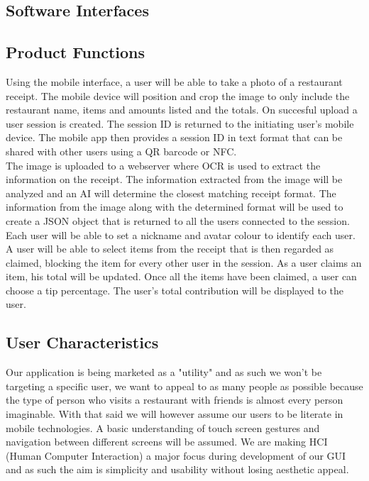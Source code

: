 \documentclass[12pt,a4paper]{article}
\begin{document}
   	\subsection{Software Interfaces}
   	\subsection{Product Functions}
		Using the mobile interface, a user will be able to take a photo of a restaurant receipt. The mobile device will position and crop the image to only include the restaurant name, items and amounts listed and the totals. On succesful upload a user session is created. The session ID is returned to the initiating user's mobile device. The mobile app then provides a session ID in text format that can be shared with other users using a QR barcode or NFC.\\
		The image is uploaded to a webserver where OCR is used to extract the information on the receipt. The information extracted from the image will be analyzed and an AI will determine the closest matching receipt format. The information from the image along with the determined format will be used to create a JSON object that is returned to all the users connected to the session.\\
		Each user will be able to set a nickname and avatar colour to identify each user. A user will be able to select items from the receipt that is then regarded as claimed, blocking the item for every other user in the session. As a user claims an item, his total will be updated. Once all the items have been claimed, a user can choose a tip percentage. The user's total contribution will be displayed to the user.
	\subsection{User Characteristics}
		Our application is being marketed as a "utility" and as such we won't be targeting a specific user, we want to appeal to as many people as possible because the type of person who visits a restaurant with friends is almost every person imaginable. With that said we will however assume our users to be literate in mobile technologies. A basic understanding of touch screen gestures and navigation between different screens will be assumed. We are making HCI (Human Computer Interaction) a major focus during development of our GUI and as such the aim is simplicity and usability without losing aesthetic appeal.
\end{document}
